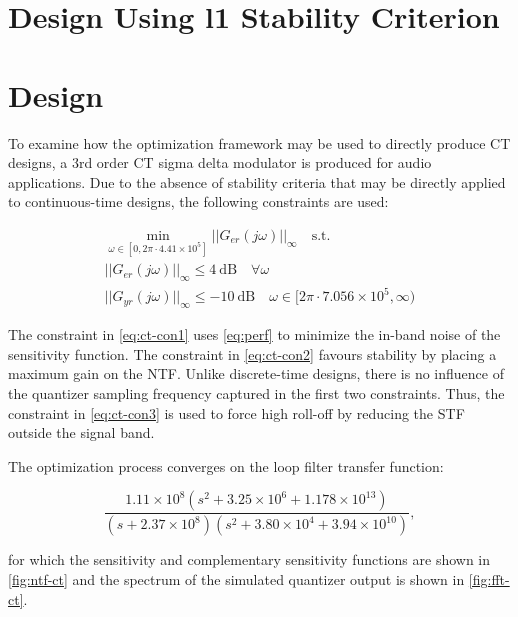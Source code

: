 \section{Design Using \gls{l1} Stability Criterion}
\label{sec:ex-l1}

\section{ Design}
\label{sec:ex-ct}

To examine how the optimization framework may be used to directly produce \gls{CT} designs, a 3rd order \gls{CT} sigma delta modulator is produced for audio applications. Due to the absence of stability criteria that may be directly applied to continuous-time designs, the following constraints are used:

\begin{gather}
	\min_{\omega \in [0, 2\pi\cdot4.41\times10^5]} ||G_{er}(j\omega)||_\infty \quad \textrm{s.t.} \label{eq:ct-con1} \\
	||G_{er}(j\omega)||_\infty \leq \SI{4}{\deci\bel} \quad \forall \omega \label{eq:ct-con2} \\
	||G_{yr}(j\omega)||_\infty \leq \SI{-10}{\deci\bel} \quad \omega \in [2\pi\cdot7.056\times10^5, \infty) \label{eq:ct-con3}
\end{gather}

The constraint in \autoref{eq:ct-con1} uses \autoref{eq:perf} to minimize the in-band noise of the sensitivity function. The constraint in \autoref{eq:ct-con2} favours stability by placing a maximum gain on the \gls{NTF}. Unlike discrete-time designs, there is no influence of the quantizer sampling frequency captured in the first two constraints. Thus, the constraint in \autoref{eq:ct-con3} is used to force high roll-off by reducing the \gls{STF} outside the signal band.

The optimization process converges on the loop filter transfer function:

\begin{equation*}
	\frac{1.11\times10^8\left(s^2 + 3.25\times10^6 + 1.178\times10^{13}\right)}{\left(s + 2.37\times10^8\right)\left(s^2 + 3.80\times10^4 + 3.94\times10^{10}\right)},
\end{equation*}

for which the sensitivity and complementary sensitivity functions are shown in \autoref{fig:ntf-ct} and the spectrum of the simulated quantizer output is shown in \autoref{fig:fft-ct}.

